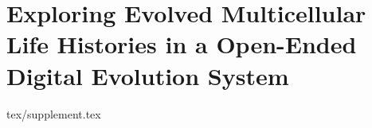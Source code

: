 \chapter{Exploring Evolved Multicellular Life Histories in a Open-Ended Digital Evolution System}
\label{ch:case-studies-appendix}

{tex/supplement.tex}
